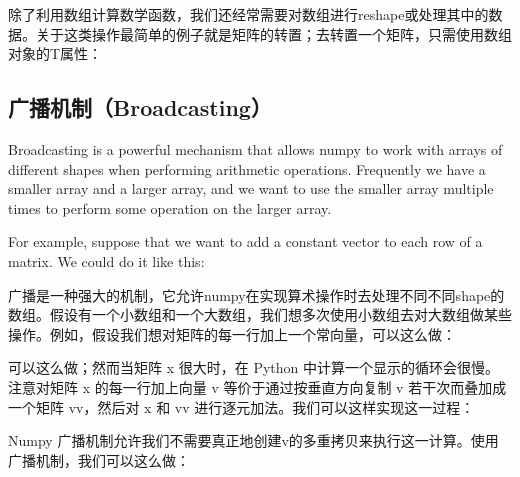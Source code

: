\documentclass[10pt,a4paper]{article}
\begin{document}
除了利用数组计算数学函数，我们还经常需要对数组进行reshape或处理其中的数据。关于这类操作最简单的例子就是矩阵的转置；去转置一个矩阵，只需使用数组对象的T属性：



\subsection{广播机制（Broadcasting）}


Broadcasting is a powerful mechanism that allows numpy to work with arrays of different shapes when performing arithmetic operations. Frequently we have a smaller array and a larger array, and we want to use the smaller array multiple times to perform some operation on the larger array.

For example, suppose that we want to add a constant vector to each row of a matrix. We could do it like this:

广播是一种强大的机制，它允许numpy在实现算术操作时去处理不同不同shape的数组。假设有一个小数组和一个大数组，我们想多次使用小数组去对大数组做某些操作。例如，假设我们想对矩阵的每一行加上一个常向量，可以这么做：




可以这么做；然而当矩阵 x 很大时，在 Python 中计算一个显示的循环会很慢。注意对矩阵 x 的每一行加上向量 v 等价于通过按垂直方向复制 v 若干次而叠加成一个矩阵 vv，然后对 x 和 vv 进行逐元加法。我们可以这样实现这一过程： 






Numpy 广播机制允许我们不需要真正地创建v的多重拷贝来执行这一计算。使用广播机制，我们可以这么做：




\end{document}
